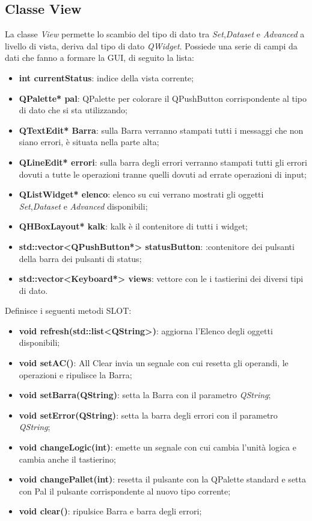 \documentclass[a4paper,10pt]{article}
\begin{document}
        \subsection{Classe View}
        La classe \textit{View} permette lo scambio del tipo di dato tra \textit{Set},\textit{Dataset} e \textit{Advanced} a livello di vista, deriva dal tipo di dato \textit{QWidget}.
        Possiede una serie di campi da dati che fanno a formare la GUI, di seguito la lista:
        \begin{itemize}
            \item \textbf{int currentStatus}: indice della vista corrente;
            \item \textbf{QPalette* pal}: QPalette per colorare il QPushButton corrispondente al tipo di dato che si sta utilizzando;
            \item \textbf{QTextEdit* Barra}: sulla Barra verranno stampati tutti i messaggi che non siano errori, è situata nella parte alta;
            \item \textbf{QLineEdit* errori}: sulla barra degli errori verranno stampati tutti gli errori dovuti a tutte le operazioni tranne quelli dovuti ad errate operazioni di input;
            \item \textbf{QListWidget* elenco}: elenco su cui verrano mostrati gli oggetti \textit{Set},\textit{Dataset} e \textit{Advanced} disponibili;
            \item \textbf{QHBoxLayout* kalk}: kalk è il contenitore di tutti i widget;
            \item \textbf{std::vector<QPushButton*> statusButton}: :contenitore dei pulsanti della barra dei pulsanti di status;
            \item \textbf{std::vector<Keyboard*> views}: vettore con le i tastierini dei diversi tipi di dato.
        \end{itemize}
        Definisce i seguenti metodi SLOT:
        \begin{itemize}
            \item \textbf{void refresh(std::list<QString>)}: aggiorna l'Elenco degli oggetti disponibili;
            \item \textbf{void setAC()}: All Clear invia un segnale con cui resetta gli operandi, le operazioni e ripulisce la Barra;
            \item \textbf{void setBarra(QString)}: setta la Barra con il parametro \textit{QString};
            \item \textbf{void setError(QString)}: setta la barra degli errori con il parametro \textit{QString};
            \item \textbf{void changeLogic(int)}: emette un segnale con cui cambia l'unità logica e cambia anche il tastierino;
            \item \textbf{void changePallet(int)}: resetta il pulsante con la QPalette standard e setta con Pal il pulsante corrispondente al nuovo tipo corrente;
            \item \textbf{void clear()}: ripulsice Barra e barra degli errori;
        \end{itemize}
\end{document}
